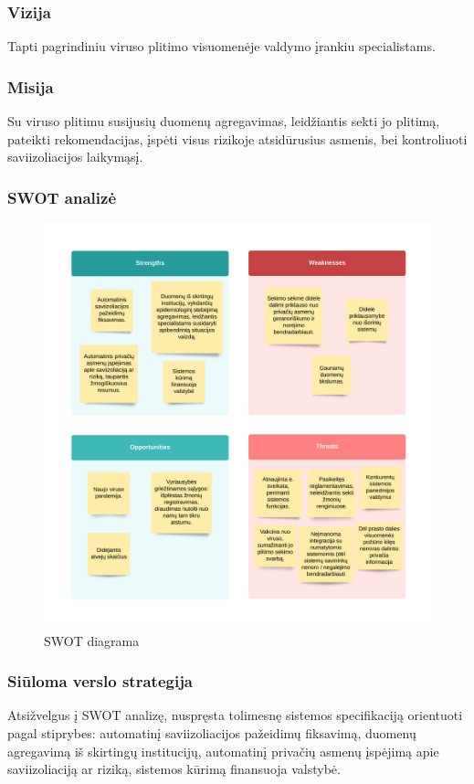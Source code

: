 \documentclass{VUMIFPSkursinis}
\begin{document}
\subsubsection{Vizija}
Tapti pagrindiniu viruso plitimo visuomenėje valdymo įrankiu specialistams.

\subsubsection{Misija}
Su viruso plitimu susijusių duomenų agregavimas, leidžiantis sekti jo plitimą, pateikti rekomendacijas,
įspėti visus rizikoje atsidūrusius asmenis, bei kontroliuoti saviizoliacijos laikymąsį.

\subsubsection{SWOT analizė}

\begin{figure}[H]
	\centering
	\includegraphics[scale=0.7]{img/SWOT.png}
	\caption{SWOT diagrama}
	\label{img:swot_diagram}
\end{figure}

\subsubsection{Siūloma verslo strategija}
Atsižvelgus į SWOT analizę, nuspręsta tolimesnę sistemos specifikaciją orientuoti pagal stiprybes: automatinį saviizoliacijos pažeidimų fiksavimą, duomenų agregavimą iš skirtingų institucijų, automatinį privačių asmenų įspėjimą apie saviizoliaciją ar riziką, sistemos kūrimą finansuoja valstybė.
\end{document}
